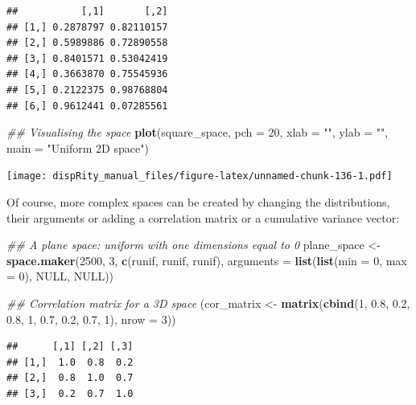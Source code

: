 \documentclass[
]{book}
\newenvironment{Shaded}{\begin{snugshade}}{\end{snugshade}}
\newcommand{\CommentTok}[1]{\textcolor[rgb]{0.56,0.35,0.01}{\textit{#1}}}
\newcommand{\DataTypeTok}[1]{\textcolor[rgb]{0.13,0.29,0.53}{#1}}
\newcommand{\DecValTok}[1]{\textcolor[rgb]{0.00,0.00,0.81}{#1}}
\newcommand{\FloatTok}[1]{\textcolor[rgb]{0.00,0.00,0.81}{#1}}
\newcommand{\KeywordTok}[1]{\textcolor[rgb]{0.13,0.29,0.53}{\textbf{#1}}}
\newcommand{\NormalTok}[1]{#1}
\newcommand{\OtherTok}[1]{\textcolor[rgb]{0.56,0.35,0.01}{#1}}
\newcommand{\StringTok}[1]{\textcolor[rgb]{0.31,0.60,0.02}{#1}}
\begin{document}
\begin{verbatim}
##           [,1]       [,2]
## [1,] 0.2878797 0.82110157
## [2,] 0.5989886 0.72890558
## [3,] 0.8401571 0.53042419
## [4,] 0.3663870 0.75545936
## [5,] 0.2122375 0.98768804
## [6,] 0.9612441 0.07285561
\end{verbatim}

\begin{Shaded}
\begin{Highlighting}[]
\CommentTok{\#\# Visualising the space}
\KeywordTok{plot}\NormalTok{(square\_space, }\DataTypeTok{pch =} \DecValTok{20}\NormalTok{, }\DataTypeTok{xlab =} \StringTok{""}\NormalTok{, }\DataTypeTok{ylab =} \StringTok{""}\NormalTok{,}
     \DataTypeTok{main =} \StringTok{"Uniform 2D space"}\NormalTok{)}
\end{Highlighting}
\end{Shaded}

\texttt{[image: dispRity\_manual\_files/figure-latex/unnamed-chunk-136-1.pdf]}

Of course, more complex spaces can be created by changing the distributions, their arguments or adding a correlation matrix or a cumulative variance vector:

\begin{Shaded}
\begin{Highlighting}[]
\CommentTok{\#\# A plane space: uniform with one dimensions equal to 0}
\NormalTok{plane\_space \textless{}{-}}\StringTok{ }\KeywordTok{space.maker}\NormalTok{(}\DecValTok{2500}\NormalTok{, }\DecValTok{3}\NormalTok{, }\KeywordTok{c}\NormalTok{(runif, runif, runif),}
                           \DataTypeTok{arguments =} \KeywordTok{list}\NormalTok{(}\KeywordTok{list}\NormalTok{(}\DataTypeTok{min =} \DecValTok{0}\NormalTok{, }\DataTypeTok{max =} \DecValTok{0}\NormalTok{),}
                           \OtherTok{NULL}\NormalTok{, }\OtherTok{NULL}\NormalTok{))}

\CommentTok{\#\# Correlation matrix for a 3D space}
\NormalTok{(cor\_matrix \textless{}{-}}\StringTok{ }\KeywordTok{matrix}\NormalTok{(}\KeywordTok{cbind}\NormalTok{(}\DecValTok{1}\NormalTok{, }\FloatTok{0.8}\NormalTok{, }\FloatTok{0.2}\NormalTok{, }\FloatTok{0.8}\NormalTok{, }\DecValTok{1}\NormalTok{, }\FloatTok{0.7}\NormalTok{, }\FloatTok{0.2}\NormalTok{, }\FloatTok{0.7}\NormalTok{, }\DecValTok{1}\NormalTok{), }\DataTypeTok{nrow =} \DecValTok{3}\NormalTok{))}
\end{Highlighting}
\end{Shaded}

\begin{verbatim}
##      [,1] [,2] [,3]
## [1,]  1.0  0.8  0.2
## [2,]  0.8  1.0  0.7
## [3,]  0.2  0.7  1.0
\end{verbatim}
\end{document}
